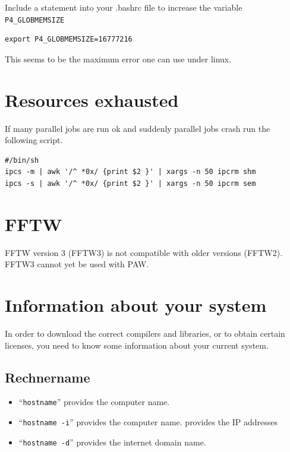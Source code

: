 \documentclass[a4paper,10pt]{report}
\newcommand{\mytt}[1]{{\tt #1}}
\begin{document}
Include a statement into your .bashrc file to increase the variable
\mytt{P4\_GLOBMEMSIZE}
\begin{verbatim}
export P4_GLOBMEMSIZE=16777216
\end{verbatim}
This seems to be the maximum error one can use under linux.


\section{Resources exhausted}
If many parallel jobs are run ok and suddenly parallel jobs crash run the following script.
\begin{verbatim}
#/bin/sh
ipcs -m | awk '/^ *0x/ {print $2 }' | xargs -n 50 ipcrm shm
ipcs -s | awk '/^ *0x/ {print $2 }' | xargs -n 50 ipcrm sem
\end{verbatim}

\section{FFTW}

FFTW version 3 (FFTW3) is not compatible with older versions
(FFTW2). FFTW3 cannot yet be used with PAW.

\section{Information about your system}
In order to download the correct compilers and libraries, or to obtain
certain licenses, you need to know some information about your current
system.

\subsection{Rechnername}
\begin{itemize}
\item  ``\mytt{hostname}'' provides the computer name.
\item  ``\mytt{hostname -i}'' provides the computer name. provides the IP addresses
\item  ``\mytt{hostname -d}'' provides the internet domain name.
\end{itemize}
\end{document}
